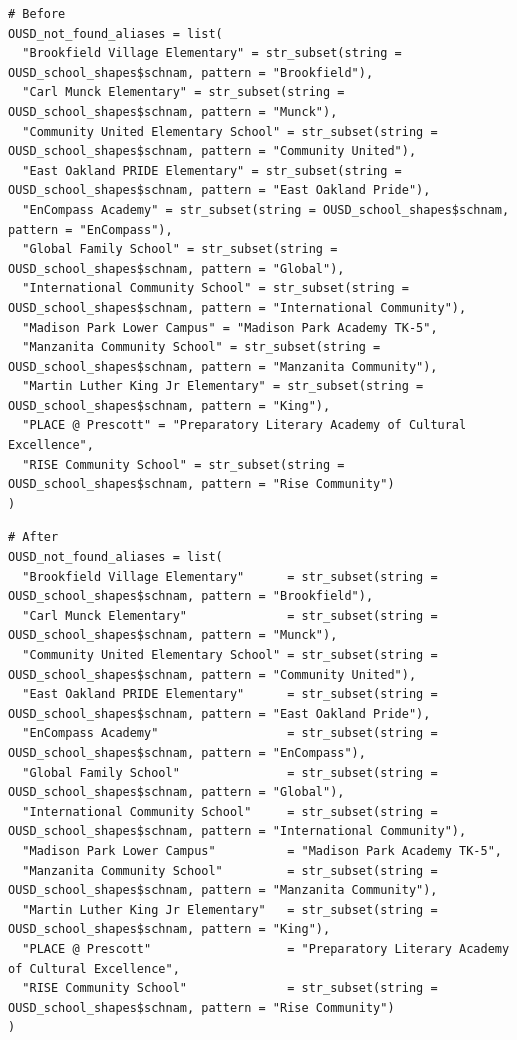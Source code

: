 \documentclass[
]{book}
\begin{document}
\begin{verbatim}
# Before
OUSD_not_found_aliases = list(
  "Brookfield Village Elementary" = str_subset(string = OUSD_school_shapes$schnam, pattern = "Brookfield"),
  "Carl Munck Elementary" = str_subset(string = OUSD_school_shapes$schnam, pattern = "Munck"),
  "Community United Elementary School" = str_subset(string = OUSD_school_shapes$schnam, pattern = "Community United"),
  "East Oakland PRIDE Elementary" = str_subset(string = OUSD_school_shapes$schnam, pattern = "East Oakland Pride"),
  "EnCompass Academy" = str_subset(string = OUSD_school_shapes$schnam, pattern = "EnCompass"),
  "Global Family School" = str_subset(string = OUSD_school_shapes$schnam, pattern = "Global"),
  "International Community School" = str_subset(string = OUSD_school_shapes$schnam, pattern = "International Community"),
  "Madison Park Lower Campus" = "Madison Park Academy TK-5",
  "Manzanita Community School" = str_subset(string = OUSD_school_shapes$schnam, pattern = "Manzanita Community"),
  "Martin Luther King Jr Elementary" = str_subset(string = OUSD_school_shapes$schnam, pattern = "King"),
  "PLACE @ Prescott" = "Preparatory Literary Academy of Cultural Excellence",
  "RISE Community School" = str_subset(string = OUSD_school_shapes$schnam, pattern = "Rise Community")
)
\end{verbatim}

\begin{verbatim}
# After
OUSD_not_found_aliases = list(
  "Brookfield Village Elementary"      = str_subset(string = OUSD_school_shapes$schnam, pattern = "Brookfield"),
  "Carl Munck Elementary"              = str_subset(string = OUSD_school_shapes$schnam, pattern = "Munck"),
  "Community United Elementary School" = str_subset(string = OUSD_school_shapes$schnam, pattern = "Community United"),
  "East Oakland PRIDE Elementary"      = str_subset(string = OUSD_school_shapes$schnam, pattern = "East Oakland Pride"),
  "EnCompass Academy"                  = str_subset(string = OUSD_school_shapes$schnam, pattern = "EnCompass"),
  "Global Family School"               = str_subset(string = OUSD_school_shapes$schnam, pattern = "Global"),
  "International Community School"     = str_subset(string = OUSD_school_shapes$schnam, pattern = "International Community"),
  "Madison Park Lower Campus"          = "Madison Park Academy TK-5",
  "Manzanita Community School"         = str_subset(string = OUSD_school_shapes$schnam, pattern = "Manzanita Community"),
  "Martin Luther King Jr Elementary"   = str_subset(string = OUSD_school_shapes$schnam, pattern = "King"),
  "PLACE @ Prescott"                   = "Preparatory Literary Academy of Cultural Excellence",
  "RISE Community School"              = str_subset(string = OUSD_school_shapes$schnam, pattern = "Rise Community")
)
\end{verbatim}
\end{document}
